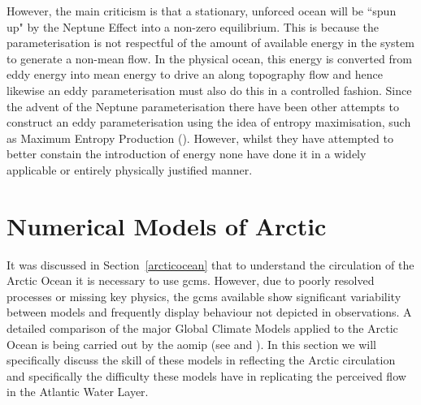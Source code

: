 \documentclass[12pt,a4paper]{report}
\newcommand*\secref[1]{Section~\ref{#1}}
\begin{document}
                	 However, the main criticism is that a stationary, unforced ocean will
                	  be ``spun up" by the Neptune Effect into a non-zero equilibrium. 
                	  This is because the parameterisation is not respectful
                	 of the amount of available energy in the system to generate a non-mean
                	 flow. In the physical ocean, this energy is converted from eddy
                	 energy into mean energy to drive an along topography flow and
                	 hence likewise an eddy parameterisation must also do this in a controlled fashion. Since the advent of the Neptune parameterisation there
                	 have been other attempts to construct an eddy parameterisation
                	 using the idea of entropy  maximisation, such as 
                	 Maximum Entropy Production (\cite{polyakov2001eddy}). However,
                	 whilst they have attempted to better constain the introduction of energy none have done it in a widely applicable or entirely 
                	 physically justified manner.
                	
\section{Numerical Models of Arctic}
\label{arcticnumerics}

	It was discussed in \secref{arcticocean} that to understand the circulation of the Arctic
	 Ocean it is necessary to use \glspl{gcm}. However, due to poorly resolved processes or
	  missing key physics, the \glspl{gcm} available show significant variability between
	   models and frequently display behaviour not depicted in observations. 
	A detailed comparison of the major Global Climate Models applied to the Arctic Ocean is
	 being carried out by the \gls{aomip} (see \cite{proshutinsky2008toward} and
	  \cite{proshutinsky2011recent}). In this section we will specifically discuss the skill
	   of these models in reflecting the Arctic circulation and specifically the difficulty
	    these models have in replicating the perceived flow in the Atlantic Water Layer.  
\end{document}

